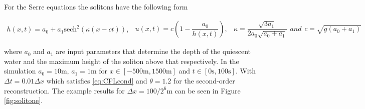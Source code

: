 \documentclass[SingleSpace,12pt,Proceedings]{Serre_ASCE}
\begin{document}
For the Serre equations the solitons have the following form
\begin{linenomath}
\begin{subequations}
\begin{gather}
h\left(x,t\right) = a_0 + a_1\text{sech}^2\left( \kappa\left(x - ct\right)\right),
\end{gather}
\begin{gather}
u\left(x,t\right) = c\left(1 - \dfrac{a_0}{h(x,t)} \right),
\end{gather}
\begin{gather}
\kappa = \dfrac{\sqrt{3a_1}}{2a_0 \sqrt{ a_0 + a_1}}
\end{gather}
and
\begin{gather}
c = \sqrt{g \left(a_0 + a_1\right)}
\end{gather}
\label{eq:sol}
\end{subequations}
\end{linenomath}
where $a_0$ and $a_1$ are input parameters that determine the depth of the quiescent water and the maximum height of the soliton above that respectively. In the simulation $a_0 = 10\text{m}$, $a_1 = 1\text{m}$ for $x\in\left[-500\text{m},1500\text{m}\right]$ and $t\in\left[0\text{s},100\text{s}\right]$. With $\Delta t = 0.01 \Delta x$ which satisfies \eqref{eq:CFLcond} and $\theta = 1.2$ for the second-order reconstruction. The example results for $\Delta x = 100 /2^{6}\text{m}$ can be seen in Figure \ref{fig:solitone}.
\end{document}
